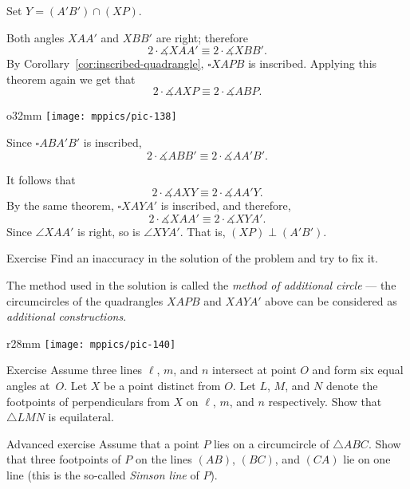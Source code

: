 Set $Y=(A'B')\cap (XP)$.

Both angles $XAA'$ and $XBB'$ are right;
therefore
\[2\cdot\measuredangle XAA'
\equiv
2\cdot\measuredangle XBB'.\]
By Corollary~\ref{cor:inscribed-quadrangle},  $\square XAPB$ is inscribed.
Applying this theorem again we get that
\[2\cdot\measuredangle AXP
\equiv
2\cdot\measuredangle ABP.\]

\begin{wrapfigure}[9]{o}{32mm}
\vskip-7mm
\centering
\texttt{[image: mppics/pic-138]}
\end{wrapfigure}

Since $\square ABA'B'$ is inscribed, 
\[2\cdot\measuredangle ABB'
\equiv
2\cdot\measuredangle AA'B'.\]

It follows that 
\[2\cdot\measuredangle AXY
\equiv
2\cdot\measuredangle AA'Y.\]
By the same theorem, $\square XAYA'$ is inscribed,
and
therefore, 
\[2\cdot\measuredangle XAA'
\equiv
2\cdot\measuredangle XYA'.\]
Since $\angle XAA'$ is right, 
so is $\angle XYA'$. 
That is, $(XP)\perp(A'B')$.
\qeds

\begin{thm}{Exercise}\label{ex:inaccuracy}
Find an inaccuracy in the solution of the problem and try to fix it.
\end{thm}

The method used in the solution 
is called the \textit{method of additional circle}
--- the circumcircles of the quadrangles $XAPB$ and $XAYA'$ 
 above can be considered as \textit{additional constructions}. 

{

\begin{wrapfigure}{r}{28mm}
\vskip-8mm
\centering
\texttt{[image: mppics/pic-140]}
\end{wrapfigure}

\begin{thm}{Exercise}\label{ex:equilateral-2}
Assume three lines $\ell$, $m$, and $n$ intersect at point $O$ and form six equal angles at~$O$. 
Let $X$ be a point distinct from $O$.
Let $L$, $M$, and $N$ denote the footpoints of perpendiculars from $X$ on $\ell$, $m$, and $n$ respectively.
Show that $\triangle LMN$ is equilateral.
\end{thm}
}

\begin{thm}{Advanced exercise}\label{ex:simson}
Assume that a point $P$ lies on a circumcircle of $\triangle ABC$.
Show that three footpoints of $P$ on the lines $(AB)$, $(BC)$, and $(CA)$ lie on one line
(this is the so-called \emph{Simson line} of $P$).
\end{thm}

